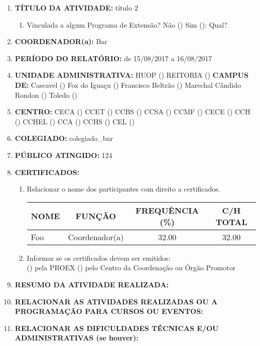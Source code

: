 \documentclass[12pt,a4paper,oneside,brazil]{article}%
\begin{document}
\begin{enumerate}%
\item%
\textbf{TÍTULO DA ATIVIDADE: }%
título 2%
\begin{enumerate}%
\item%
Vinculada a algum Programa de Extensão? %
Não () Sim (): Qual? %
\end{enumerate}%
\item%
\textbf{COORDENADOR(a): }%
Bar%
\item%
\textbf{PERÍODO DO RELATÓRIO: }%
de 15/08/2017 a 16/08/2017%
\item%
\textbf{UNIDADE ADMINISTRATIVA: }%
HUOP () %
REITORIA () %
\newline%
\textbf{CAMPUS DE: }%
Cascavel () %
Foz do Iguaçu () %
Francisco Beltrão () %
Marechal Cândido Rondon () %
Toledo () %
\item%
\textbf{CENTRO: }%
\newline%
CECA () %
CCET () %
CCBS () %
CCSA () %
CCMF () %
CECE () %
CCH () %
CCHEL () %
CCA () %
CCHS () %
CEL () %
\item%
\textbf{COLEGIADO: }%
colegiado\_bar%
\item%
\textbf{PÚBLICO ATINGIDO: }%
124%
\item%
\textbf{CERTIFICADOS: }%
\begin{enumerate}%
\item%
Relacionar o nome dos participantes com direito a certificados.%
\newline%
\begin{tabularx}{\linewidth}{|>{\centering\arraybackslash}X|
                                  @{    }c@{    }|
                                  @{    }c@{    }|
                                  @{    }c@{    }|
                              }%
\hline%
NOME&FUNÇÃO&FREQUÊNCIA (\%)&C/H TOTAL\\%
\hline%
Foo&Coordenador(a)&32.00&32.00\\%
\hline%
\end{tabularx}%
\linebreak%
\item%
Informar se os certificados devem ser emitidos: \\%
() pela PROEX \hfill () pelo Centro da Coordenação ou Órgão Promotor%
\end{enumerate}%
\item%
\textbf{RESUMO DA ATIVIDADE REALIZADA: }%
%
\item%
\textbf{RELACIONAR AS ATIVIDADES REALIZADAS OU A PROGRAMAÇÃO PARA CURSOS OU EVENTOS: }%
%
\item%
\textbf{RELACIONAR AS DIFICULDADES TÉCNICAS E/OU ADMINISTRATIVAS (se houver): }%
%
\end{enumerate}%
\end{document}
